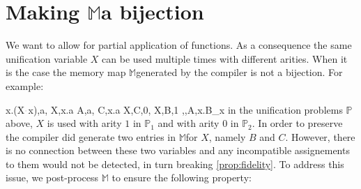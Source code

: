 \documentclass[sigconf,natbib=false,review]{acmart}
\newcommand{\appsep}{\ensuremath{\textcolor{lightgray}{\cdot}}}
\newcommand{\UnifRel}{\ensuremath{\simeq}}
\newcommand{\Ue}{\ensuremath{\UnifRel_m}\xspace}
\newcommand{\linkMacro}[1]{\ensuremath{#1}\texttt{-link}\xspace}
\newcommand{\linketa} {\linkMacro{\eta}}
\newcommand{\lhs}{lhs\xspace}
\newcommand{\rhs}{rhs\xspace}
\newcommand{\mapStore}{\texorpdfstring{\ensuremath{\mathbb{M}}\xspace}{M}}
\newcommand{\foUnifPb}{\ensuremath{\mathbb{P}}\xspace}
\begin{document}

\begin{comment}
\paragraph{Example of \progressetadedup}

A very basic example of \linketa deduplication, is given below:
\printAlll
  {{{\lambda x.(X\appsep x),\lambda x.(Y\appsep x)}}}
  {{{A,C}}}
  {{{X,B,1},
    {Y,D,1}}}
  {{{\eta,,A,\lambda x.B_{x}},
    {\eta,,C,\lambda x.D_{x}}}}

\noindent
The result of $A \Ue{} C$ is that the two \linketa share the same \lhs.
By unifying the two \rhs we get
$\sigma = \{ A~ \mapsto C, B \mapsto D ~\}$.
In turn, given the map \mapStore, this second assignment is decompiled to
$\rho = \{~ X \mapsto Y ~\}$ as expected.
\end{comment}



\section{Making \mapStore a bijection}
\label{sec:invariant1}

We want to allow for partial application of functions.
As a consequence
the same unification variable $X$ can be used multiple times
with different arities.
When it is the case the
memory map \mapStore generated by the compiler is not
a bijection. For example:
\begin{comment}
%
\printAlll
  {{{\lambda x.\lambda y.(X\appsep y\appsep x),\lambda x.\lambda y.x},
    {\lambda x.(f\appsep (X\appsep x)\appsep x),Y}}}
  {{{A,\lambda x.\lambda y.x},
    {D,F}}}
  {{{X,E,1},
    {Y,F,0},
    {X,C,2}}}
  {{{\eta,,D,\lambda x.(f\appsep E_{x}\appsep x)},
    {\eta,,A,\lambda x.B_{x}},
    {\eta,x,B_{x},\lambda y.C_{y x}}}}
\end{comment}
\printAlll
  {{{\lambda x.(X\appsep x),a},
    {X,\lambda x.a}}}
  {{{A,a},
    {C,\lambda x.a}}}
  {{{X,C,0},
    {X,B,1}}}
  {{{\eta,,A,\lambda x.B_{x}}}}
in the unification problems \foUnifPb above, $X$ is used with arity $1$ in
$\foUnifPb_1$ and with arity $0$ in $\foUnifPb_2$. 
In order to preserve  the compiler
did generate two entries in \mapStore for $X$, namely $B$ and $C$. 
However, there is no connection between these two variables
and any incompatible assignements to them would not be detected,
in turn breaking \cref{prop:fidelity}. 
To address this issue, we post-process \mapStore
to ensure the following property:
\end{document}
